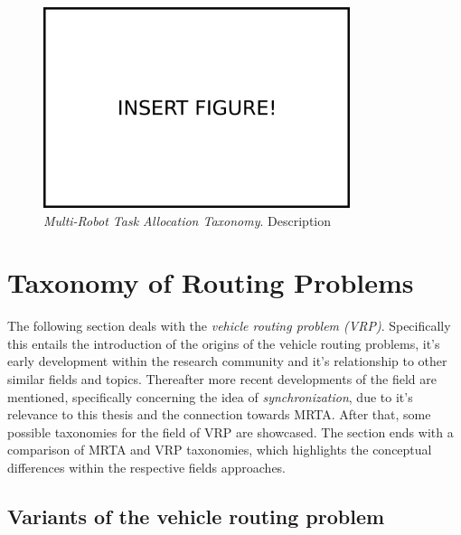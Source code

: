 \begin{figure}
\centering
\includegraphics[width=0.8\textwidth]{img/insert_figure_here.png}
\caption[Multi-Robot Task Allocation Taxonomy]{\label{fig:mrta-taxonomies} \textit{Multi-Robot Task Allocation Taxonomy}. Description}
\end{figure}

\newpage

\section{Taxonomy of Routing Problems} \label{sec:vrp-taxonomy}

The following section deals with the \textit{vehicle routing problem (VRP)}. Specifically this entails the introduction of the origins of the vehicle routing problems, it's early development within the research community and it's relationship to other similar fields and topics. Thereafter more recent developments of the field are mentioned, specifically concerning the idea of \textit{synchronization}, due to it's relevance to this thesis and the connection towards MRTA. After that, some possible taxonomies for the field of VRP are showcased. The section ends with a comparison of MRTA and VRP taxonomies, which highlights the conceptual differences within the respective fields approaches.

\subsection{Variants of the vehicle routing problem}


